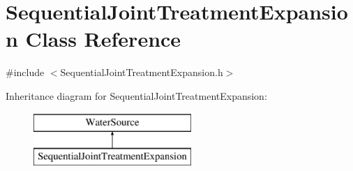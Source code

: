 \hypertarget{classSequentialJointTreatmentExpansion}{}\section{Sequential\+Joint\+Treatment\+Expansion Class Reference}
\label{classSequentialJointTreatmentExpansion}


{\ttfamily \#include $<$Sequential\+Joint\+Treatment\+Expansion.\+h$>$}

Inheritance diagram for Sequential\+Joint\+Treatment\+Expansion\+:\begin{figure}[H]
\begin{center}
\leavevmode
\includegraphics[height=2.000000cm]{classSequentialJointTreatmentExpansion}
\end{center}
\end{figure}

